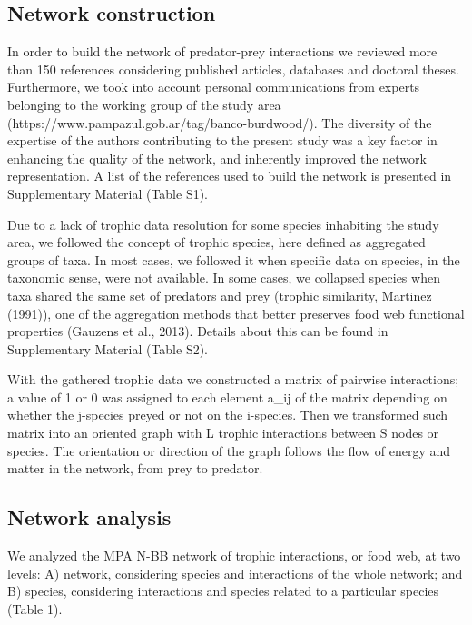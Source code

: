 \documentclass[preprint, 3p,
authoryear]{elsarticle} %
\begin{document}
\hypertarget{network-construction}{%
\subsection{Network construction}\label{network-construction}}

In order to build the network of predator-prey interactions we reviewed
more than 150 references considering published articles, databases and
doctoral theses. Furthermore, we took into account personal
communications from experts belonging to the working group of the study
area (https://www.pampazul.gob.ar/tag/banco-burdwood/). The diversity of
the expertise of the authors contributing to the present study was a key
factor in enhancing the quality of the network, and inherently improved
the network representation. A list of the references used to build the
network is presented in Supplementary Material (Table S1).

Due to a lack of trophic data resolution for some species inhabiting the
study area, we followed the concept of trophic species, here defined as
aggregated groups of taxa. In most cases, we followed it when specific
data on species, in the taxonomic sense, were not available. In some
cases, we collapsed species when taxa shared the same set of predators
and prey (trophic similarity, Martinez (1991)), one of the aggregation
methods that better preserves food web functional properties (Gauzens et
al., 2013). Details about this can be found in Supplementary Material
(Table S2).

With the gathered trophic data we constructed a matrix of pairwise
interactions; a value of 1 or 0 was assigned to each element a\_ij of
the matrix depending on whether the j-species preyed or not on the
i-species. Then we transformed such matrix into an oriented graph with L
trophic interactions between S nodes or species. The orientation or
direction of the graph follows the flow of energy and matter in the
network, from prey to predator.

\hypertarget{network-analysis}{%
\subsection{Network analysis}\label{network-analysis}}

We analyzed the MPA N-BB network of trophic interactions, or food web,
at two levels: A) network, considering species and interactions of the
whole network; and B) species, considering interactions and species
related to a particular species (Table 1).
\end{document}
